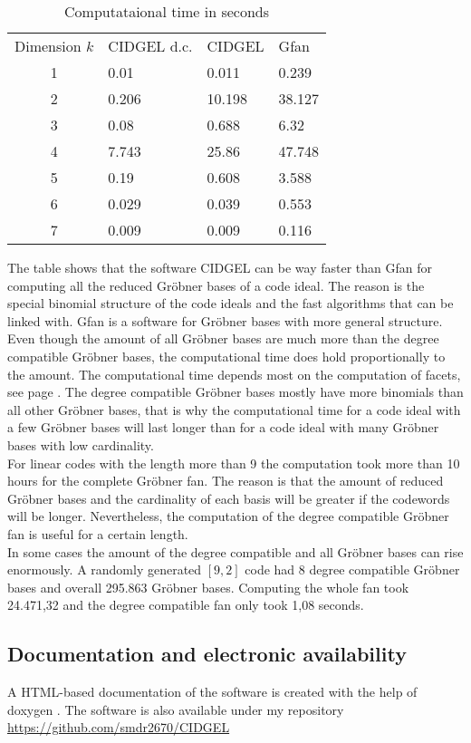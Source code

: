  \begin{table}[htpb] 
 \centering 
 \caption{Computataional time in seconds}
 \begin{tabular}{c|l|l|l} %
  Dimension $k$ & CIDGEL d.c. & CIDGEL & Gfan \\
 \cline{1-4} 1  & 0.01  & 0.011  & 0.239 \\
  2  & 0.206 & 10.198 & 38.127 \\
  3  & 0.08  & 0.688  & 6.32 \\
  4  & 7.743 & 25.86  & 47.748 \\
  5  & 0.19  & 0.608  & 3.588  \\
  6  & 0.029 & 0.039  & 0.553\\
  7  & 0.009 & 0.009  & 0.116 \\
 \end{tabular}
 \label{tab:meinetabelle}
 \end{table}
 
 The table shows that the software CIDGEL can be way faster than Gfan for computing all the reduced Gröbner bases of a code ideal. The reason is the special binomial structure of the code ideals and the fast algorithms that can be linked with. Gfan is a software for Gröbner bases with more general structure.
 Even though the amount of all Gröbner bases are much more than the degree compatible Gröbner bases, the computational time does hold proportionally to the amount.
 The computational time depends most on the computation of facets, see page \pageref{facets}. The degree compatible Gröbner bases mostly have more binomials than all other Gröbner bases, that is why the computational time for a code ideal with a few Gröbner bases will last longer than for a code ideal with many Gröbner bases with low cardinality. \\
 
 For linear codes with the length more than 9 the computation took more than 10 hours for the complete Gröbner fan. The reason is that the amount of reduced Gröbner bases and the cardinality of each basis will be greater if the codewords will be longer. Nevertheless, the computation of the degree compatible Gröbner fan is useful for a certain length.\\
 
 In some cases the amount of the degree compatible and all Gröbner bases can rise enormously. A randomly generated $[9,2]$ code had 8 degree compatible Gröbner bases and overall 295.863 Gröbner bases. 
 Computing the whole fan took 24.471,32 and the degree compatible fan only took 1,08 seconds. 
    



\subsection{Documentation and electronic availability}
\label{subsec:docu}
A HTML-based documentation of the software is created with the help of doxygen \cite{doxygen}.
The software is also available under my repository \\ \url{https://github.com/smdr2670/CIDGEL}


\newpage

